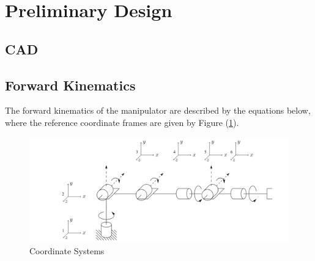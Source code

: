 \documentclass[12pt]{report}
\begin{document}
\newpage
\section{Preliminary Design}
\subsection{CAD}
\newpage
\subsection{Forward Kinematics}
The forward kinematics of the manipulator are described by the equations below, where the reference coordinate frames are given by Figure (\ref{fig:coords}).
\begin{figure}[htp]
  \centering
  \includegraphics[width=.9\textwidth]{zero2}
  \caption{Coordinate Systems}
  \label{fig:coords}
\end{figure}
\end{document}
